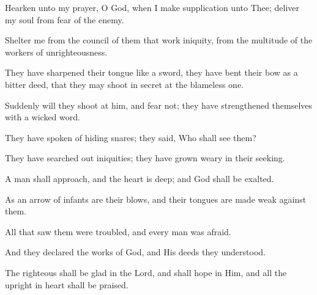 Hearken unto my prayer, O God, when I make supplication unto Thee; deliver my soul from fear of the enemy.

Shelter me from the council of them that work iniquity, from the multitude of the workers of unrighteousness.

They have sharpened their tongue like a sword, they have bent their bow as a bitter deed, that they may shoot in secret at the blameless one.

Suddenly will they shoot at him, and fear not; they have strengthened themselves with a wicked word.

They have spoken of hiding snares; they said, Who shall see them?

They have searched out iniquities; they have grown weary in their seeking.

A man shall approach, and the heart is deep; and God shall be exalted.

As an arrow of infants are their blows, and their tongues are made weak against them.

All that saw them were troubled, and every man was afraid.

And they declared the works of God, and His deeds they understood.

The righteous shall be glad in the Lord, and shall hope in Him, and all the upright in heart shall be praised.
